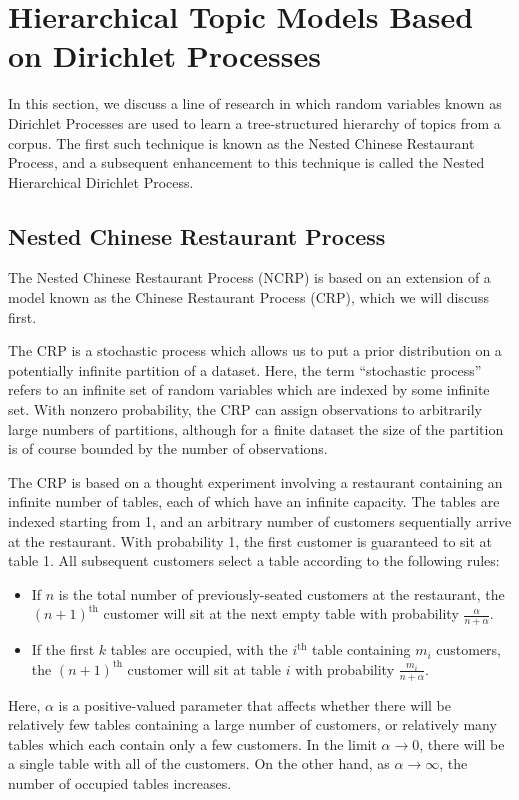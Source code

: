 \documentclass{article}
\newcommand{\nth}{^{\text{th}}}
\begin{document}
\section{Hierarchical Topic Models Based on Dirichlet Processes}

In this section, we discuss a line of research in which random variables known as Dirichlet Processes are used to learn a tree-structured hierarchy of topics from a corpus.
The first such technique is known as the Nested Chinese Restaurant Process, and a subsequent enhancement to this technique is called the Nested Hierarchical Dirichlet Process.

\subsection{Nested Chinese Restaurant Process}

The Nested Chinese Restaurant Process (NCRP) is based on an extension of a model known as the Chinese Restaurant Process (CRP), which we will discuss first.

The CRP is a stochastic process which allows us to put a prior distribution on a potentially infinite partition of a dataset.
Here, the term ``stochastic process'' refers to an infinite set of random variables which are indexed by some infinite set.
With nonzero probability, the CRP can assign observations to arbitrarily large numbers of partitions, although for a finite dataset the size of the partition is of course bounded by the number of observations.

The CRP is based on a thought experiment involving a restaurant containing an infinite number of tables, each of which have an infinite capacity.
The tables are indexed starting from 1, and an arbitrary number of customers sequentially arrive at the restaurant.
With probability 1, the first customer is guaranteed to sit at table 1.
All subsequent customers select a table according to the following rules:
\begin{itemize}
\item If $n$ is the total number of previously-seated customers at the restaurant, the $(n+1)\nth$ customer will sit at the next empty table with probability $\frac{\alpha}{n + \alpha}$.
\item If the first $k$ tables are occupied, with the $i\nth$ table containing $m_i$ customers, the $(n+1)\nth$ customer will sit at table $i$ with probability $\frac{m_i}{n+\alpha}$.
\end{itemize}
Here, $\alpha$ is a positive-valued parameter that affects whether there will be relatively few tables containing a large number of customers, or relatively many tables which each contain only a few customers.
In the limit $\alpha \to 0$, there will be a single table with all of the customers.
On the other hand, as $\alpha \to \infty$, the number of occupied tables increases.
\end{document}
